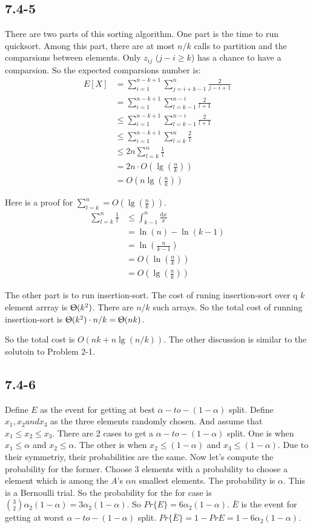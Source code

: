 \documentclass{book}
\begin{document}
\begin{CJK}{UTF8}{gkai}
\subsection*{7.4-5} There are two parts of this sorting algorithm. One part is the 
time to run quicksort. Among this part, there are at most $n/k$ calls to 
partition and the comparsions between elements. Only $z_{ij}$ ($j-i \ge k$) has 
a chance to have a comparsion. So the expected comparsions number is:
\begin{align*}
E[X] & = \sum_{i=1}^{n-k+1}\sum_{j=i+k-1}^{n}\frac{2}{j-i+1} \\
& = \sum_{i=1}^{n-k+1}\sum_{l=k-1}^{n-i}\frac{2}{l+1} \\
& \le \sum_{i=1}^{n-k+1}\sum_{l=k-1}^{n-i}\frac{2}{l+1} \\
& \le \sum_{i=1}^{n-k+1}\sum_{l=k}^{n}\frac{2}{l} \\
& \le 2n\sum_{l=k}^{n}\frac{1}{l} \\
& = 2n \cdot O(\lg(\frac{n}{k})) \\
& = O(n\lg(\frac{n}{k}))
\end{align*}

Here is a proof for $\sum_{l=k}^{n} = O(\lg(\frac{n}{k}))$.
\begin{align*}
\sum_{l=k}^{n}\frac{1}{l} & \le \int_{k-1}^{n}\frac{\mathrm{d}x}{x} \\
& = \ln(n) - \ln(k-1) \\
& = \ln(\frac{n}{k-1}) \\
& = O(\ln(\frac{n}{k})) \\
& = O(\lg(\frac{n}{k}))
\end{align*}

The other part is to run insertion-sort. The cost of runing insertion-sort over 
q $k$ element arrray is $\Uptheta(k^2)$. There are $n/k$ such arrays. So the 
total cost of running insertion-sort is $\Uptheta(k^2)\cdot n/k = \Uptheta(nk)$.

So the total cost is $O(nk+n\lg(n/k))$. The other discussion is similar to the 
solutoin to Problem 2-1.

\subsection*{7.4-6} Define $E$ as the event for getting at best 
$\alpha-to-(1-\alpha)$ split. Define $x_1, x_2 and x_3$ as the three elements 
randomly chosen. And assume that $x_1 \le x_2 \le x_3$. There are 2 cases to get 
a $\alpha-to-(1-\alpha)$ split. One is when $x_1 \le \alpha$ and $x_2 \le 
\alpha$. The other is when $x_2 \le (1-\alpha)$ and $x_3 \le (1-\alpha)$. Due to 
their symmetriy, their probabilities are the same. Now let's compute the 
probability for the former. Choose 3 elements with a probability to choose a 
element which is among the $A$'s $\alpha n$ smallest elements. The probability 
is $\alpha$. This is a Bernoulli trial. So the probability for the for case is 
$\binom{3}{2}\alpha_2(1-\alpha) = 3\alpha_2(1-\alpha)$. So $Pr\{E\} = 
6\alpha_2(1-\alpha)$. $\bar{E}$ is the event for getting at worst 
$\alpha-to-(1-\alpha)$ split. $Pr\{\bar{E}\} = 1 - Pr{E} = 1 - 
6\alpha_2(1-\alpha)$.


\end{CJK}
\end{document}

